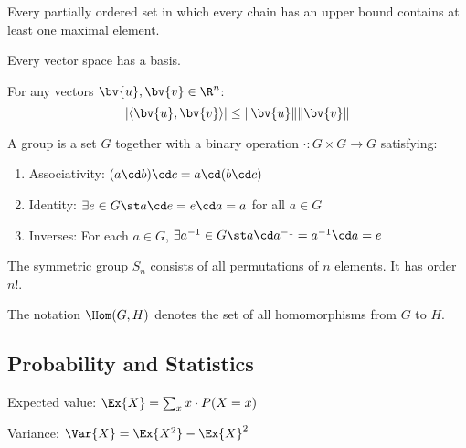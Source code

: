 \documentclass[12pt]{amsart}
\begin{document}
\begin{lemma}
Every partially ordered set in which every chain has an upper bound contains at least one maximal element.
\end{lemma}

\begin{corollary}
Every vector space has a basis.
\end{corollary}

\begin{proposition}
For any vectors $\bv{u}, \bv{v} \in \R^n$:
$$|\langle \bv{u}, \bv{v} \rangle| \leq \|\bv{u}\| \|\bv{v}\|$$
\end{proposition}

\begin{definition}[Group]
A group is a set $G$ together with a binary operation $\cdot: G \times G \to G$ satisfying:
\begin{enumerate}
    \item Associativity: $(a \cd b) \cd c = a \cd (b \cd c)$
    \item Identity: $\exists e \in G \st a \cd e = e \cd a = a$ for all $a \in G$
    \item Inverses: For each $a \in G$, $\exists a^{-1} \in G \st a \cd a^{-1} = a^{-1} \cd a = e$
\end{enumerate}
\end{definition}

\begin{example}
The symmetric group $S_n$ consists of all permutations of $n$ elements. It has order $n!$.
\end{example}

\begin{remark}
The notation $\Hom(G, H)$ denotes the set of all homomorphisms from $G$ to $H$.
\end{remark}


\subsection{Probability and Statistics}

Expected value: $\Ex{X} = \sum_{x} x \cdot P(X = x)$

Variance: $\Var{X} = \Ex{X^2} - \Ex{X}^2$
\end{document}
